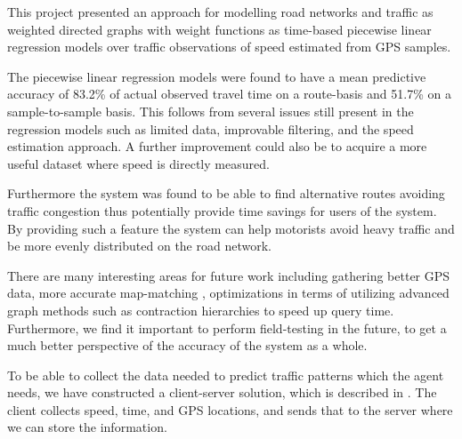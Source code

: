 This project presented an approach for modelling road networks and traffic as weighted directed graphs with weight functions as time-based piecewise linear regression models over traffic observations of speed estimated from GPS samples.

The piecewise linear regression models were found to have a mean predictive accuracy of 83.2\% of actual observed travel time on a route-basis and 51.7\% on a sample-to-sample basis. This follows from several issues still present in the regression models such as limited data, improvable filtering, and the speed estimation approach. A further improvement could also be to acquire a more useful dataset where speed is directly measured.

Furthermore the system was found to be able to find alternative routes avoiding traffic congestion thus potentially provide time savings for users of the system. By providing such a feature the system can help motorists avoid heavy traffic and be more evenly distributed on the road network.

There are many interesting areas for future work including gathering better GPS data, more accurate map-matching , optimizations in terms of utilizing advanced graph methods such as contraction hierarchies to speed up query time. Furthermore, we find it important to perform field-testing in the future, to get a much better perspective of the accuracy of the system as a whole.

To be able to collect the data needed to predict traffic patterns which the agent needs, we have constructed a client-server solution, which is described in . The client collects speed, time, and GPS locations, and sends that to the server where we can store the information.